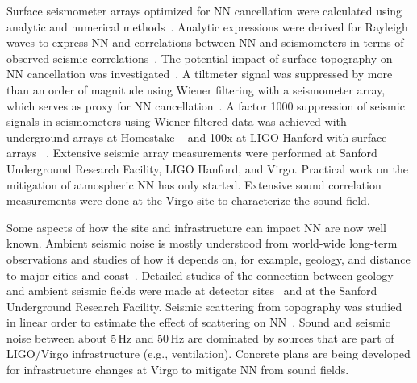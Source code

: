 Surface seismometer arrays optimized for NN cancellation were calculated using analytic and numerical methods~\cite{Har2015,CoEA2016a}. Analytic expressions were derived for Rayleigh waves to express NN and correlations between NN and seismometers in terms of observed seismic correlations~\cite{Har2015,CoEA2016a}. The potential impact of surface topography on NN cancellation was investigated~\cite{CoHa2012}. A tiltmeter signal was suppressed by more than an order of magnitude using Wiener filtering with a seismometer array, which serves as proxy for NN cancellation~\cite{HaVe2016,CoEA2018}. A factor 1000 suppression of seismic signals in seismometers using Wiener-filtered data was achieved with underground arrays at Homestake ~\cite{CoEA2014} and 100x at LIGO Hanford with surface arrays ~\cite{CoEA2018}. Extensive seismic array measurements were performed at Sanford Underground Research Facility, LIGO Hanford, and Virgo. Practical work on the mitigation of atmospheric NN has only started. Extensive sound correlation measurements were done at the Virgo site to characterize the sound field.

Some aspects of how the site and infrastructure can impact NN are now well known. 
Ambient seismic noise is mostly understood from world-wide long-term observations and studies of how it depends on, for example, geology, and distance to major cities and coast~\cite{CoHa2012b}. Detailed studies of the connection between geology and ambient seismic fields were made at detector sites~\cite{HaOR2011} and at the Sanford Underground Research Facility. Seismic scattering from topography was studied in linear order to estimate the effect of scattering on NN~\cite{CoHa2012}. Sound and seismic noise between about 5\,Hz and 50\,Hz are dominated by sources that are part of LIGO/Virgo infrastructure (e.g., ventilation). Concrete plans are being developed for infrastructure changes at Virgo to mitigate NN from sound fields.

